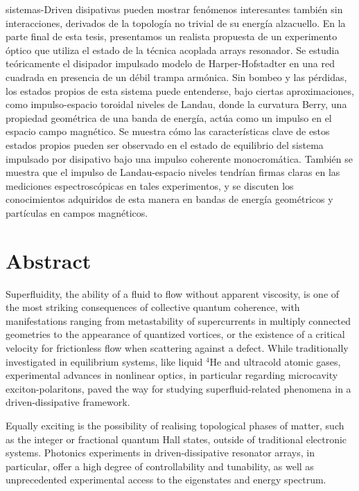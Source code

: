 sistemas-Driven disipativas pueden mostrar fenómenos interesantes
también sin interacciones, derivados de la topología no trivial de su
energía alzacuello. En la parte final de esta tesis, presentamos un
realista propuesta de un experimento óptico que utiliza el estado de
la técnica acoplada arrays resonador. Se estudia teóricamente el
disipador impulsado modelo de Harper-Hofstadter en una red cuadrada en
presencia de un débil trampa armónica. Sin bombeo y las pérdidas, los
estados propios de esta sistema puede entenderse, bajo ciertas
aproximaciones, como impulso-espacio toroidal niveles de Landau, donde
la curvatura Berry, una propiedad geométrica de una banda de energía,
actúa como un impulso en el espacio campo magnético. Se muestra cómo
las características clave de estos estados propios pueden ser
observado en el estado de equilibrio del sistema impulsado por
disipativo bajo una impulso coherente monocromática. También se
muestra que el impulso de Landau-espacio niveles tendrían firmas
claras en las mediciones espectroscópicas en tales experimentos, y se
discuten los conocimientos adquiridos de esta manera en bandas de
energía geométricos y partículas en campos magnéticos.


\chapter*{Abstract}

Superfluidity, the ability of a fluid to flow without apparent
viscosity, is one of the most striking consequences of collective
quantum coherence, with manifestations ranging from metastability of
supercurrents in multiply connected geometries to the appearance of
quantized vortices, or the existence of a critical velocity for
frictionless flow when scattering against a defect. While
traditionally investigated in equilibrium systems, like liquid
${}^4$He and ultracold atomic gases, experimental advances in
nonlinear optics, in particular regarding microcavity
exciton-polaritons, paved the way for studying superfluid-related
phenomena in a driven-dissipative framework.

Equally exciting is the possibility of realising topological phases of
matter, such as the integer or fractional quantum Hall states, outside
of traditional electronic systems. Photonics experiments in
driven-dissipative resonator arrays, in particular, offer a high
degree of controllability and tunability, as well as unprecedented
experimental access to the eigenstates and energy spectrum.

